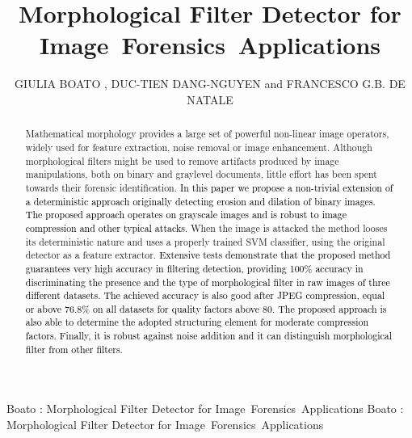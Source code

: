 \documentclass{ieeeaccess}
\newcommand{\revisedtext}[1]{\textcolor{black}{#1}}
\begin{document}

\title{Morphological Filter Detector for Image~Forensics~Applications}
\author{\uppercase{Giulia Boato} ,
\uppercase{Duc-Tien Dang-Nguyen}  and \uppercase{Francesco G.B. De Natale}}
\address[1]{University of Trento, Italy (e-mail: giulia.boato@unitn.it; francesco.denatale@unitn.it)}
\address[2]{University of Bergen, Norway(e-mail: ductien.dangnguyen@uib.no)}
\address[3]{Italian Consortium of Telecommunications (CNIT)}

\markboth
{Boato \headeretal: Morphological Filter Detector for Image~Forensics~Applications}
{Boato \headeretal: Morphological Filter Detector for Image~Forensics~Applications}


\begin{abstract}
Mathematical morphology provides a large set of powerful non-linear image operators, widely used for feature extraction, noise removal or image enhancement. Although morphological filters might be used to remove artifacts produced by image manipulations, both on binary and graylevel documents, little effort has been spent towards their forensic identification. \revisedtext{In this paper we propose a non-trivial extension of a deterministic approach originally detecting erosion and dilation of binary images.
The proposed approach operates on grayscale images and is robust to image compression and other typical attacks.} When the image is attacked the method looses its deterministic nature and uses a properly trained SVM classifier, using the original detector as a feature extractor. \revisedtext{Extensive tests demonstrate that the proposed method guarantees very high accuracy in filtering detection, providing 100\% accuracy in discriminating the presence and
the type of morphological filter in raw images of three different datasets. The achieved accuracy is also good after JPEG compression, equal or above 76.8\% on all datasets for quality factors above 80. The proposed approach is also able to determine the adopted structuring element for moderate compression factors. Finally, it is robust against noise addition and it can distinguish morphological filter from other filters.}
\end{abstract}
\end{document}
